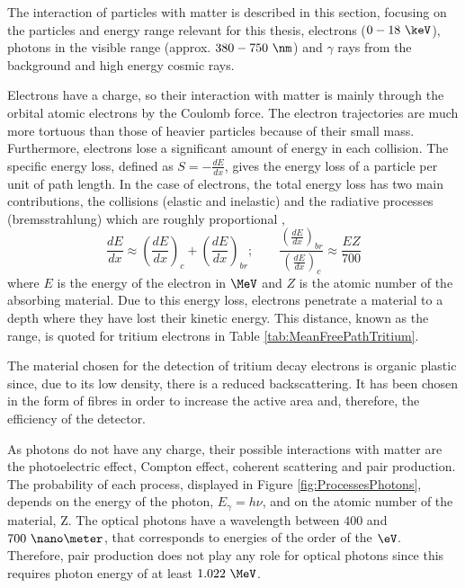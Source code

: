 The interaction of particles with matter is described in this section, focusing on the particles and energy range relevant for this thesis, electrons ($0-18~\keV$), photons in the visible range (approx. $380-750~\nm$) and $\gamma$ rays from the background and high energy cosmic rays.

Electrons have a charge, so their interaction with matter is mainly through the orbital atomic  electrons by the Coulomb force. The electron trajectories are much more tortuous than those of heavier particles because of their small mass. Furthermore, electrons lose a significant amount of energy in each collision. The specific energy loss, defined as $S=-\displaystyle{\frac{dE}{dx}}$, gives the energy loss of a particle per unit of path length. In the case of electrons, the total energy loss has two main contributions, the collisions (elastic and inelastic) and the radiative processes (bremsstrahlung) which are roughly proportional \cite{Knoll, Leo},
\begin{equation}
\frac{dE}{dx} \approx \left(\frac{dE}{dx}\right)_{c} + \left(\frac{dE}{dx}\right)_{br} ; \qquad \frac{\displaystyle{\left(\frac{dE}{dx}\right)_{br}}}{\displaystyle{\left(\frac{dE}{dx}\right)_{c}}} \approx \frac{EZ}{700}
\label{eq:ElectronInteraction}
\end{equation}
where $E$ is the energy of the electron in $\MeV$ and $Z$ is the atomic number of the absorbing material. Due to this energy loss, electrons penetrate a material to a depth where they have lost their kinetic energy. This distance, known as the range, is quoted for tritium electrons in Table \ref{tab:MeanFreePathTritium}. 

The material chosen for the detection of tritium decay electrons is organic plastic since, due to its low density, there is a reduced backscattering. It has been chosen in the form of fibres in order to increase the active area and, therefore, the efficiency of the detector.

As photons do not have any charge, their possible interactions with matter are the photoelectric effect, Compton effect, coherent scattering and pair production. The probability of each process, displayed in Figure \ref{fig:ProcessesPhotons}, depends on the energy of the photon, $E_\gamma = h\nu$, and on the atomic number of the material, Z. The optical photons have a wavelength between $400$ and $700~\nano\meter$, that corresponds to energies of the order of the $\eV$. Therefore, pair production does not play any role for optical photons since this requires photon energy of at least $1.022~\MeV$.

